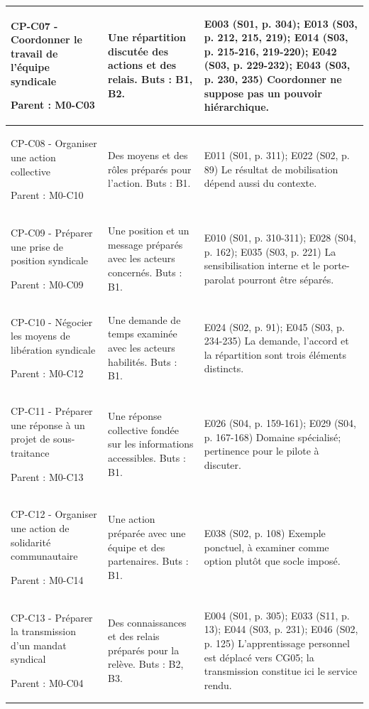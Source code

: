 \documentclass[9pt,a4paper,landscape]{extarticle}
\begin{document}
\begin{longtable}{|p{61mm}|p{84mm}|p{115mm}|}
CP-C07 - Coordonner le travail de l’équipe syndicale\par Parent : M0-C03 & Une répartition discutée des actions et des relais. Buts : B1, B2. & E003 (S01, p. 304); E013 (S03, p. 212, 215, 219); E014 (S03, p. 215-216, 219-220); E042 (S03, p. 229-232); E043 (S03, p. 230, 235) Coordonner ne suppose pas un pouvoir hiérarchique.\\\hline
CP-C08 - Organiser une action collective\par Parent : M0-C10 & Des moyens et des rôles préparés pour l’action. Buts : B1. & E011 (S01, p. 311); E022 (S02, p. 89) Le résultat de mobilisation dépend aussi du contexte.\\\hline
CP-C09 - Préparer une prise de position syndicale\par Parent : M0-C09 & Une position et un message préparés avec les acteurs concernés. Buts : B1. & E010 (S01, p. 310-311); E028 (S04, p. 162); E035 (S03, p. 221) La sensibilisation interne et le porte-parolat pourront être séparés.\\\hline
CP-C10 - Négocier les moyens de libération syndicale\par Parent : M0-C12 & Une demande de temps examinée avec les acteurs habilités. Buts : B1. & E024 (S02, p. 91); E045 (S03, p. 234-235) La demande, l’accord et la répartition sont trois éléments distincts.\\\hline
CP-C11 - Préparer une réponse à un projet de sous-traitance\par Parent : M0-C13 & Une réponse collective fondée sur les informations accessibles. Buts : B1. & E026 (S04, p. 159-161); E029 (S04, p. 167-168) Domaine spécialisé; pertinence pour le pilote à discuter.\\\hline
CP-C12 - Organiser une action de solidarité communautaire\par Parent : M0-C14 & Une action préparée avec une équipe et des partenaires. Buts : B1. & E038 (S02, p. 108) Exemple ponctuel, à examiner comme option plutôt que socle imposé.\\\hline
CP-C13 - Préparer la transmission d’un mandat syndical\par Parent : M0-C04 & Des connaissances et des relais préparés pour la relève. Buts : B2, B3. & E004 (S01, p. 305); E033 (S11, p. 13); E044 (S03, p. 231); E046 (S02, p. 125) L’apprentissage personnel est déplacé vers CG05; la transmission constitue ici le service rendu.\\\hline
\end{longtable}
\par
\end{document}
